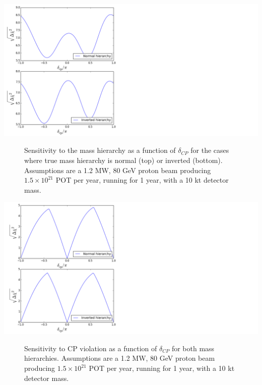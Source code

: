 \documentclass[12pt]{article}
\begin{document}
\begin{center}
\includegraphics[scale=0.9]{MH_sensitivity2.png}
\begin{figure}[h!]
\caption{Sensitivity to the mass hierarchy as a function of $\delta_{CP}$ for the cases where true mass hierarchy is normal (top) or inverted (bottom). Assumptions are a 1.2 MW, 80 GeV proton beam producing $1.5\times 10^{21}$ POT per year, running for 1 year, with a 10 kt detector mass.}
\label{fig:sensitivity4}
\end{figure}
\end{center}
\begin{center}
\includegraphics[scale=0.9]{CPV_sensitivity2.png}
\begin{figure}[h!]
\caption{Sensitivity to CP violation as a function of $\delta_{CP}$ for both mass hierarchies. Assumptions are a 1.2 MW, 80 GeV proton beam producing $1.5\times 10^{21}$ POT per year, running for 1 year, with a 10 kt detector mass.}
\label{fig:sensitivity3}
\end{figure}
\end{center}\\\\
\end{document}
